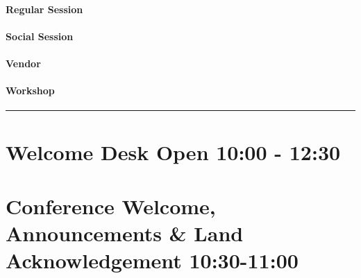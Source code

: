 \documentclass[
]{book}
\begin{document}
\begin{session}
\hypertarget{regular-session}{%
\paragraph{Regular Session}\label{regular-session}}
\end{session}

\begin{social}
\hypertarget{social-session}{%
\paragraph{Social Session}\label{social-session}}
\end{social}
\begin{vendor}
\hypertarget{vendor}{%
\paragraph{Vendor}\label{vendor}}
\end{vendor}

\begin{workshop}
\hypertarget{workshop}{%
\paragraph{Workshop}\label{workshop}}
\end{workshop}

\begin{center}\rule{0.5\linewidth}{0.5pt}\end{center}

\hypertarget{welcome-desk-open-1000---1230}{%
\section*{Welcome Desk Open \textbar{} 10:00 - 12:30}\label{welcome-desk-open-1000---1230}}

\hypertarget{conference-welcome-announcements-land-acknowledgement-1030-1100}{%
\section*{Conference Welcome, Announcements \& Land Acknowledgement \textbar{} 10:30-11:00}\label{conference-welcome-announcements-land-acknowledgement-1030-1100}}
\end{document}
